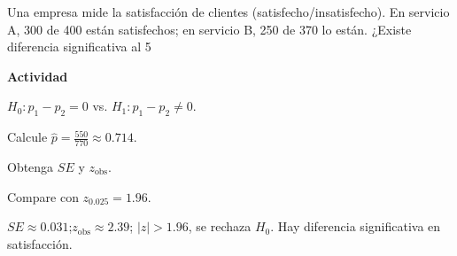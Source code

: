 \begin{ejercicio}
Una empresa mide la satisfacción de clientes (satisfecho/insatisfecho).
En servicio A, 300 de 400 están satisfechos;
en servicio B, 250 de 370 lo están.
¿Existe diferencia significativa al 5%


\textbf{Actividad}
\begin{pasos}
  \item $H_0:p_1-p_2=0$ vs. $H_1:p_1-p_2\neq 0$.
  \item Calcule $\hat{p}=\tfrac{550}{770}\approx 0.714$.
  \item Obtenga $SE$ y $z_{\text{obs}}$.
  \item Compare con $z_{0.025}=1.96$.
\end{pasos}

\begin{clave}
$SE\approx 0.031$;\quad $z_{\text{obs}}\approx 2.39$;\quad
$|z|>1.96$, se rechaza $H_0$.
Hay diferencia significativa en satisfacción.
\end{clave}
\end{ejercicio}